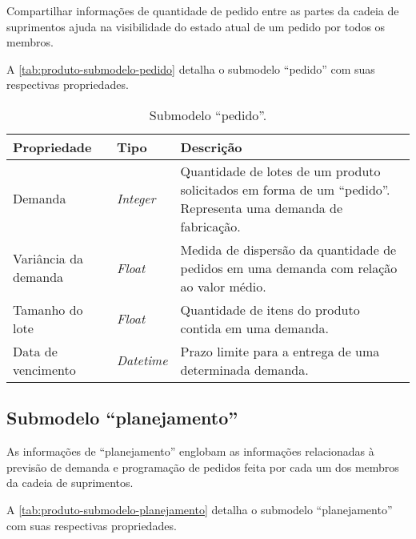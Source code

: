 Compartilhar informações de quantidade de pedido entre as partes da cadeia de suprimentos ajuda na visibilidade do estado atual de um pedido por todos os membros.

A \autoref{tab:produto-submodelo-pedido} detalha o submodelo ``pedido'' com suas respectivas propriedades.

\begin{table}[htb]
	\centering
	\caption{Submodelo ``pedido''.}
	\begin{tabular}{p{3.5cm}p{1.5cm}p{9cm}}
		\hline
		\textbf{Propriedade}
		 & \textbf{Tipo}
		 & \textbf{Descrição}                                                                                             \\

		\hline
		Demanda
		 & \textit{Integer}
		 & Quantidade de lotes de um produto solicitados em forma de um ``pedido''. Representa uma demanda de fabricação. \\

		\hline
		Variância da demanda
		 & \textit{Float}
		 & Medida de dispersão da quantidade de pedidos em uma demanda com relação ao valor médio.                        \\

		\hline
		Tamanho do lote
		 & \textit{Float}
		 & Quantidade de itens do produto contida em uma demanda.                                                         \\

		\hline
		Data de vencimento
		 & \textit{Datetime}
		 & Prazo limite para a entrega de uma determinada demanda.                                                        \\

		\hline
	\end{tabular}
	\label{tab:produto-submodelo-pedido}
\end{table}

\subsection{Submodelo ``planejamento''}

As informações de ``planejamento'' englobam as informações relacionadas à previsão de demanda e programação de pedidos feita por cada um dos membros da cadeia de suprimentos.

A \autoref{tab:produto-submodelo-planejamento} detalha o submodelo ``planejamento'' com suas respectivas propriedades.





